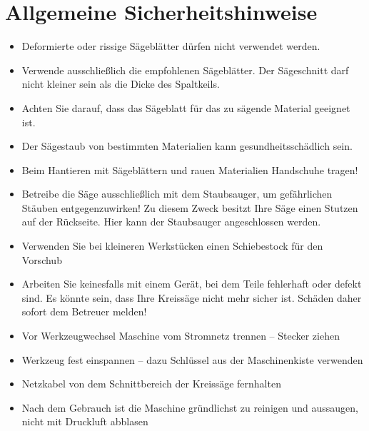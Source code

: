 \documentclass{\basedir/fablab-document}
\begin{document}
\section[Allgemeine Sicherheitshinweise]{Allgemeine Sicherheitshinweise}
\begin{itemize}

\item Deformierte oder rissige Sägeblätter dürfen nicht verwendet werden.
\item Verwende ausschließlich die empfohlenen Sägeblätter. Der Sägeschnitt darf nicht kleiner sein als die Dicke des Spaltkeils.
\item Achten Sie darauf, dass das Sägeblatt für das zu sägende Material geeignet ist.
\item Der Sägestaub von bestimmten Materialien kann gesundheitsschädlich sein.
\item Beim Hantieren mit Sägeblättern und rauen Materialien Handschuhe tragen!
\item Betreibe die Säge ausschließlich mit dem Staubsauger, um gefährlichen Stäuben entgegenzuwirken! Zu diesem Zweck besitzt Ihre Säge einen Stutzen auf der Rückseite. Hier kann der Staubsauger angeschlossen werden.
\item Verwenden Sie bei kleineren Werkstücken einen Schiebestock für den Vorschub
\item Arbeiten Sie keinesfalls mit einem Gerät, bei dem Teile fehlerhaft oder defekt sind. Es könnte sein, dass Ihre Kreissäge nicht mehr sicher ist. Schäden daher sofort dem Betreuer melden!
\item Vor Werkzeugwechsel Maschine vom Stromnetz trennen -- Stecker ziehen
\item Werkzeug fest einspannen -- dazu Schlüssel aus der Maschinenkiste verwenden
\item Netzkabel von dem Schnittbereich der Kreissäge fernhalten
\item Nach dem Gebrauch ist die Maschine gründlichst zu reinigen und aussaugen, nicht mit Druckluft abblasen
\end{itemize}
\end{document}
